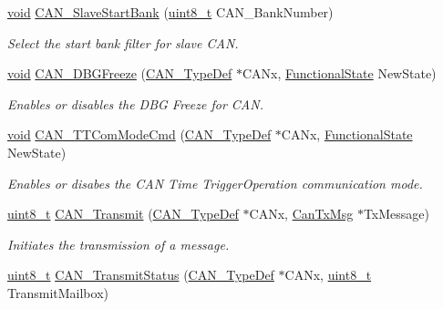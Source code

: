 \begin{DoxyCompactItemize}
\hyperlink{usb__devapi_8h_afabf60e7f57651d6d595a02c75f07cd0}{void} \hyperlink{group___c_a_n___exported___functions_ga109ff8960bc59f44b984c9646f17b3c0}{C\+A\+N\+\_\+\+Slave\+Start\+Bank} (\hyperlink{_p_e___types_8h_aba7bc1797add20fe3efdf37ced1182c5}{uint8\+\_\+t} C\+A\+N\+\_\+\+Bank\+Number)
\begin{DoxyCompactList}\small\item\em Select the start bank filter for slave C\+AN. \end{DoxyCompactList}\item 
\hyperlink{usb__devapi_8h_afabf60e7f57651d6d595a02c75f07cd0}{void} \hyperlink{group___c_a_n___exported___functions_gac0e2d33e08caf49d1f1251f0dcc20213}{C\+A\+N\+\_\+\+D\+B\+G\+Freeze} (\hyperlink{struct_c_a_n___type_def}{C\+A\+N\+\_\+\+Type\+Def} $\ast$C\+A\+Nx, \hyperlink{agilefox_2library_2inc_2stm32f10x__type_8h_ac9a7e9a35d2513ec15c3b537aaa4fba1}{Functional\+State} New\+State)
\begin{DoxyCompactList}\small\item\em Enables or disables the D\+BG Freeze for C\+AN. \end{DoxyCompactList}\item 
\hyperlink{usb__devapi_8h_afabf60e7f57651d6d595a02c75f07cd0}{void} \hyperlink{group___c_a_n___exported___functions_ga94740177bab153ca5b102d122f9a8cca}{C\+A\+N\+\_\+\+T\+T\+Com\+Mode\+Cmd} (\hyperlink{struct_c_a_n___type_def}{C\+A\+N\+\_\+\+Type\+Def} $\ast$C\+A\+Nx, \hyperlink{agilefox_2library_2inc_2stm32f10x__type_8h_ac9a7e9a35d2513ec15c3b537aaa4fba1}{Functional\+State} New\+State)
\begin{DoxyCompactList}\small\item\em Enables or disabes the C\+AN Time Trigger\+Operation communication mode. \end{DoxyCompactList}\item 
\hyperlink{_p_e___types_8h_aba7bc1797add20fe3efdf37ced1182c5}{uint8\+\_\+t} \hyperlink{group___c_a_n___exported___functions_gaccfcb81f76f58400077c7b2d8641dd83}{C\+A\+N\+\_\+\+Transmit} (\hyperlink{struct_c_a_n___type_def}{C\+A\+N\+\_\+\+Type\+Def} $\ast$C\+A\+Nx, \hyperlink{struct_can_tx_msg}{Can\+Tx\+Msg} $\ast$Tx\+Message)
\begin{DoxyCompactList}\small\item\em Initiates the transmission of a message. \end{DoxyCompactList}\item 
\hyperlink{_p_e___types_8h_aba7bc1797add20fe3efdf37ced1182c5}{uint8\+\_\+t} \hyperlink{group___c_a_n___exported___functions_ga68ab05a0a6cdfcc2b6f6b6b2c10848e2}{C\+A\+N\+\_\+\+Transmit\+Status} (\hyperlink{struct_c_a_n___type_def}{C\+A\+N\+\_\+\+Type\+Def} $\ast$C\+A\+Nx, \hyperlink{_p_e___types_8h_aba7bc1797add20fe3efdf37ced1182c5}{uint8\+\_\+t} Transmit\+Mailbox)

\end{DoxyCompactItemize}

